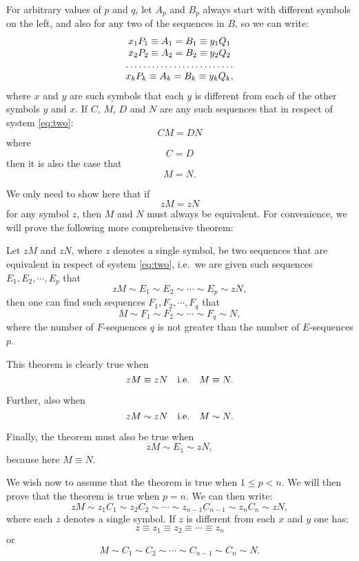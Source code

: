 For arbitrary values of $p$ and $q$, let $A_p$ and $B_p$
always start with different symbols on the left, and also for any two
of the sequences in $B$, so we can write:
$$\begin{array}{c}
x_1 P_1 \equiv A_1 = B_1 \equiv y_1Q_1\\
x_2 P_2 \equiv A_2 = B_2 \equiv y_2 Q_2\\
\hdotsfor{1}\\
x_k P_k \equiv A_k = B_k \equiv y_k Q_k,\\
\end{array}$$
where $x$ and $y$ are such symbols that each $y$ is different from
each of the other symbols $y$ and $x$.  If $C$, $M$, $D$ and $N$ are
any such sequences that in respect of system \eqref{eq:two}:
$$CM = DN$$
where
$$C = D$$
then it is also the case that
$$M = N.$$

We only need to show here that if
$$zM = zN$$
for any symbol $z$, then $M$ and $N$ must always be equivalent.
For convenience, we will prove the following more comprehensive 
theorem:

Let $zM$ and $zN$, where $z$ denotes a single symbol, be two sequences
that are equivalent in respect of system \eqref{eq:two}, i.e.\ we are given such
sequences $E_1,E_2,\cdots,E_p$ that
\begin{equation}
zM \sim E_1 \sim E_2 \sim \cdots \sim E_p \sim zN,
\label{eq:three}
\end{equation}
then one can find such sequences $F_1,F_2,\cdots,F_q$ that
\begin{equation}
M \sim F_1 \sim F_2 \sim \cdots \sim F_q \sim N, 
\label{eq:four}
\end{equation}
where the number of $F$-sequences $q$ is not greater than the number
of $E$-sequences $p$.

This 
theorem is clearly true when
$$zM \equiv zN \quad \hbox{i.e.} \quad M \equiv N.$$

Further, also when
$$zM \sim zN \quad \hbox{i.e.} \quad M \sim N.$$

Finally, 
the theorem must also be true when 
$$zM \sim E_1 \sim zN,$$
because here $M \equiv N$.

We wish now 
to assume that the theorem is true when $1 \leq p < n$.
We will then prove that the theorem is true when $p=n$.
We can then write:
\begin{equation}
zM \sim z_1C_1 \sim z_2C_2 \sim \cdots \sim z_{n-1}C_{n-1} \sim z_nC_n \sim zN,
\label{eq:five}
\end{equation}
where each $z$ denotes a single symbol.
If 
$z$ is different from each $x$ and $y$ one has:
$$z \equiv z_1 \equiv z_2 \equiv \cdots \equiv z_n$$
or
$$M \sim C_1 \sim C_2 \sim \cdots \sim C_{n-1} \sim C_n \sim N.$$

